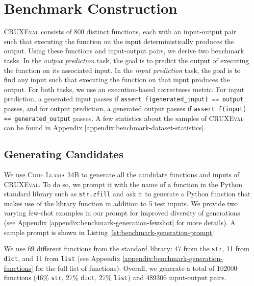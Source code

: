 \documentclass[twoside,11pt,preprint]{article}
\newcommand{\benchmark}{\textsc{CRUXEval}\xspace}
\newcommand{\codellamalarge}{\textsc{Code Llama 34B}\xspace}
\begin{document}

\section{Benchmark Construction} \label{sec:benchmark-construction}

\benchmark consists of 800 distinct functions, each with an input-output pair such that executing the function on the input deterministically produces the output. Using these functions and input-output pairs, we derive two benchmark tasks. In the \textit{output prediction} task, the goal is to predict the output of executing the function on its associated input. In the \textit{input prediction} task, the goal is to find any input such that executing the function on that input produces the output. For both tasks, we use an execution-based correctness metric. For input prediction, a generated input passes if \texttt{assert f(generated\_input) == output} passes, and for output prediction, a generated output passes if \texttt{assert f(input) == generated\_output} passes. A few statistics about the samples of \benchmark can be found in Appendix \ref{appendix:benchmark-dataset-statistics}.

\subsection{Generating Candidates} \label{subsec:generating-candidates}
We use \codellamalarge to generate all the candidate functions and inputs of \benchmark. To do so, we prompt it with the name of a function in the Python standard library such as \texttt{str.zfill} and ask it to generate a Python function that makes use of the library function in addition to 5 test inputs. We provide two varying few-shot examples in our prompt for improved diversity of generations (see Appendix \ref{appendix:benchmark-generation-fewshot} for more details). A sample prompt is shown in Listing \ref{lst:benchmark-generation-prompt}.

We use 69 different functions from the standard library: 47 from the \texttt{str}, 11 from \texttt{dict}, and 11 from \texttt{list} (see Appendix \ref{appendix:benchmark-generation-functions} for the full list of functions). Overall, we generate a total of 102000 functions (46\% \texttt{str}, 27\% \texttt{dict}, 27\% \texttt{list}) and 489306 input-output pairs.

\end{document}
